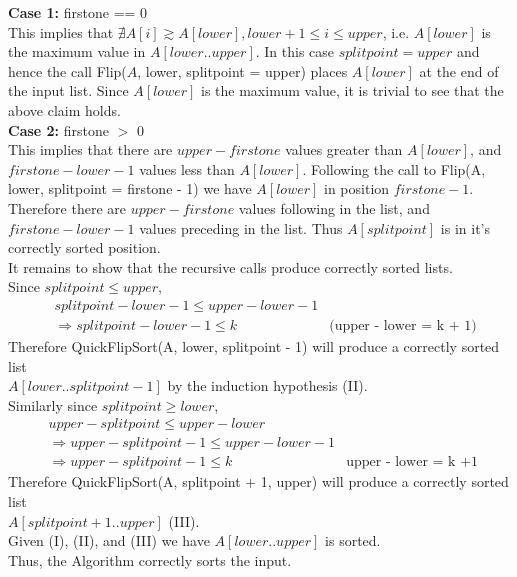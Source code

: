 \documentclass[12pt]{article}
\newenvironment{lemma}[2][Lemma]{\begin{trivlist}
\item[\hskip \labelsep {\bfseries #1}\hskip \labelsep {\bfseries #2.}]}{\end{trivlist}}
\newenvironment{question}[2][Question]{\begin{trivlist}
\item[\hskip \labelsep {\bfseries #1}\hskip \labelsep {\bfseries #2.}]}{\end{trivlist}}
\begin{document}
\begin{question}{1 (b)}
\begin{lemma}{1.5}
    \textbf{Case 1:} firstone == 0 \\
    This implies that $\nexists A[i] \gtrsim A[lower], lower + 1 \leq i \leq upper$,
    i.e. $A[lower]$ is the maximum value in $A[lower..upper]$.
    In this case $splitpoint = upper$ and hence the call Flip($A$, lower, splitpoint = upper)
    places $A[lower]$ at the end of the input list.  Since $A[lower]$ is the maximum
    value, it is trivial to see that the above claim holds. \\

    \textbf{Case 2:} firstone $>$ 0 \\
    This implies that there are $upper - firstone$ values greater than $A[lower]$,
    and $firstone - lower - 1$ values less than $A[lower]$.  Following the call
    to Flip(A, lower, splitpoint = firstone - 1) we have $A[lower]$ in position
    $firstone - 1$.  Therefore there are $upper - firstone$ values following
    in the list, and $firstone - lower - 1$ values preceding in the list.
    Thus $A[splitpoint]$ is in it's correctly sorted position. \\

    It remains to show that the recursive calls produce correctly sorted lists.\\
    Since $splitpoint \leq upper$,
    \begin{align*}
      & splitpoint - lower - 1 \leq upper - lower - 1 &\\
      & \Rightarrow splitpoint - lower - 1 \leq k & \text{(upper - lower = k + 1)}
    \end{align*}
    Therefore QuickFlipSort(A, lower, splitpoint - 1) will produce a correctly
    sorted list \\$A[lower..splitpoint - 1]$ by the induction hypothesis (II).\\
    Similarly since $splitpoint \geq lower$,
    \begin{align*}
      & upper - splitpoint \leq upper - lower & \\
      & \Rightarrow upper - splitpoint - 1 \leq upper - lower - 1 &\\
      & \Rightarrow upper - splitpoint - 1 \leq k & \text{upper - lower = k +1 }
    \end{align*}
    Therefore QuickFlipSort(A, splitpoint + 1, upper) will produce a correctly sorted
    list \\$A[splitpoint+1..upper]$ (III). \\
    Given (I), (II), and (III) we have $A[lower..upper]$ is sorted.\\
    Thus, the Algorithm correctly sorts the input.
  \end{lemma}


\end{question}
\end{document}
